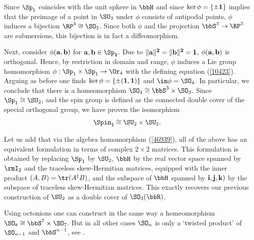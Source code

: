 \begin{example}
    Since $\Sp_1$ coincides with the unit sphere in $\bbH$ and since $\ker\phi=\{\pm\bf{1}\}$ implies that the preimage of a point in $\SO_3$ under $\phi$ consists of antipodal points, $\phi$ induces a bijection $\RP^3\cong \SO_3$. Since both $\phi$ and the projection $\bbS^3\to\RP^3$ are submersions, this bijection is in fact a diffeomorphism.

    Next, consider $\phi(\bf{a},\bf{b})$ for $\bf{a},\bf{b}\in\Sp_1$. Due to $\lVert \bf{a}\rVert^2=\lVert \bf{b}\rVert^2=1$, $\phi(\bf{a},\bf{b})$ is orthogonal. Hence, by restriction in domain and range, $\phi$ induces a Lie group homomorphism $\phi:\Sp_1\times\Sp_1\to \Or_4$ with the defining equation (\ref{10423}). Arguing as before one finds $\ker\phi=\{\pm(\bf{1},\bf{1})\}$ and $\im\phi=\SO_4$. In particular, we conclude that there is a homeomorphism $\SO_4\cong \bbS^3\times \SO_3$. Since $\Sp_1\cong \SU_2$, and the spin group is defined as the connected double cover of the special orthogonal group, we have proven the isomorphism 
    \[\Spin_4\cong \SU_2\times\SU_2.\]

    Let us add that via the algebra homomorphism (\ref{46939}), all of the above has an equivalent formulation in terms of complex $2\times 2$ matrices. This formulation is obtained by replacing $\Sp_1$ by $\SU_2$, $\bbH$ by the real vector space spanned by $\rmI_2$ and the traceless skew-Hermitian matrices, equipped with the inner product $(A,B)=\tr(A^\dagger B)$, and the subspace of $\bbH$ spanned by $\bf{i},\bf{j},\bf{k})$ by the subspace of traceless skew-Hermitian matrices. This exactly recovers our previous construction of $\SU_2$ as a double cover of $\SO_3(\bbR)$.
\end{example}

\begin{rem}
    Using octonions one can construct in the same way a homeomorphism $\SO_8\cong \bbS^7\times \SO_7$. But in all other cases $\SO_n$ is only a `twisted product' of $\SO_{n-1}$ and $\bbS^{n-1}$, see \cite[Cor.~4D.3]{Hatcher}.
\end{rem}




